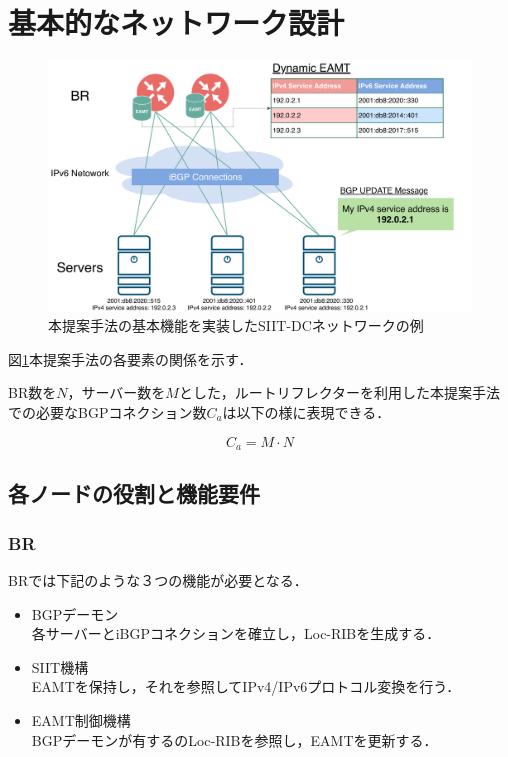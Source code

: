 \section{基本的なネットワーク設計}
\label{proposal:network}
\begin{figure}[h]
    \begin{center}
    \includegraphics[width=15cm,pagebox=cropbox,clip]{img/proposal_method_network.pdf}
    \end{center}
    \caption{本提案手法の基本機能を実装したSIIT-DCネットワークの例}
    \label{fig:proposal_method_network}
\end{figure}


図\ref{fig:proposal_method_network}本提案手法の各要素の関係を示す．

BR数を$N$，サーバー数を$M$とした，ルートリフレクターを利用した本提案手法での必要なBGPコネクション数$C_a$は以下の様に表現できる．

\begin{equation}
    C_a = M \cdot N
\end{equation}


\subsection{各ノードの役割と機能要件}
\label{proposal:network:nodes}
\subsubsection{BR}
BRでは下記のような３つの機能が必要となる．
\begin{itemize}
    \item BGPデーモン\\
    各サーバーとiBGPコネクションを確立し，Loc-RIBを生成する．
    \item SIIT機構\\
    EAMTを保持し，それを参照してIPv4/IPv6プロトコル変換を行う．
    \item EAMT制御機構\\
    BGPデーモンが有するのLoc-RIBを参照し，EAMTを更新する．
\end{itemize}

